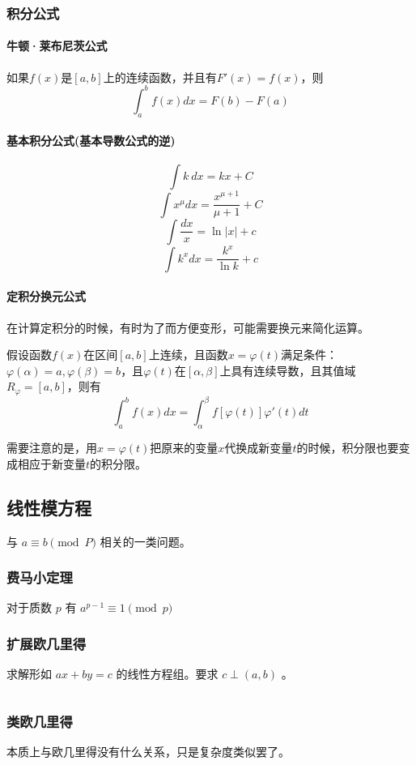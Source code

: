 \documentclass[UTF-8]{ctexart}
\newcommand{\cpp}[1]{\inputminted[bgcolor=bg,breaklines,breakanywhere=true]{c++}{#1}}
\begin{document}
			\subsubsection{积分公式}
			\paragraph{牛顿·莱布尼茨公式}如果$f(x)$是$[a,b]$上的连续函数，并且有$F'(x)=f(x)$，则$$\int _ a^b f(x)dx=F(b)-F(a)$$
			\paragraph{基本积分公式(基本导数公式的逆)}
			$$\int k\ dx=kx+C$$
			$$\int x^\mu dx=\frac{x^{\mu+1}}{\mu+1}+C$$
			$$\int \frac{dx}{x}=\ln |x|+c$$
			$$\int k^x dx=\frac{k^x}{\ln k}+c$$
			\paragraph{定积分换元公式}	在计算定积分的时候，有时为了而方便变形，可能需要换元来简化运算。  
	
			假设函数$f(x)$在区间$[a,b]$上连续，且函数$x=\varphi(t)$满足条件：$\varphi(\alpha)=a,\varphi(\beta)=b$，且$\varphi(t)$在$[\alpha,\beta]$上具有连续导数，且其值域$R_\varphi=[a,b]$，则有  
	$$\int _ a^b f(x)dx=\int _ {\alpha}^{\beta} f[\varphi(t)]\varphi'(t)dt$$  
	
			需要注意的是，用$x=\varphi(t)$把原来的变量$x$代换成新变量$t$的时候，积分限也要变成相应于新变量$t$的积分限。
		\subsection{线性模方程}
		与 $a \equiv b \pmod P$ 相关的一类问题。
			\subsubsection{费马小定理}
			对于质数 $p$ 有 $a^{p-1} \equiv 1 \pmod p$
			\subsubsection{扩展欧几里得}
			求解形如 $ax+by=c$ 的线性方程组。要求 $c \perp (a,b)$ 。
			
			\cpp{code//Math//exgcd.cpp}
			\subsubsection{类欧几里得}
			本质上与欧几里得没有什么关系，只是复杂度类似罢了。
\end{document}
